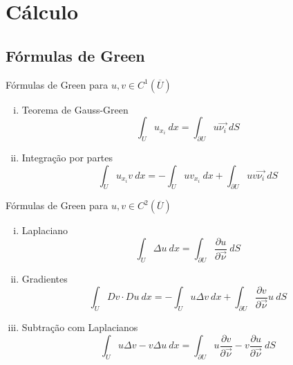 \documentclass[11pt]{article}
\newcommand{\qed}{$\hfill\square$}
\begin{document}
%


\section{Cálculo}

\subsection{Fórmulas de Green}

Fórmulas de Green para \( u,v \in C^1(\overline{U}) \)

\begin{enumerate}[(i)]
	\item Teorema de Gauss-Green \[ \int_U u_{x_i}\ dx = \int_{\partial U} u \vec{\nu_i}\ dS \]
	\item Integração por partes \[ \int_U u_{x_i} v\ dx = - \int_U u v_{x_i}\ dx + \int_{\partial U} u v \vec{\nu_i}\ dS \]
\end{enumerate}

Fórmulas de Green para \( u,v \in C^2 (\overline{U}) \)
\begin{enumerate}[(i)]
	\item Laplaciano \[ \int_U \Delta u\ dx = \int_{\partial U} \frac{\partial u}{\partial \vec{\nu}} \ dS \]
	
	\item Gradientes \[ \int_U Dv \cdot Du \ dx = -\int_U u \Delta v\ dx + \int_{\partial U} \frac{\partial v}{\partial \vec{\nu}} u \ dS \]
	
	\item Subtração com Laplacianos \[\int_U u \Delta v - v \Delta u\ dx = \int_{\partial U} u \frac{\partial v}{\partial \vec{\nu}} - v \frac{\partial u}{\partial \vec{\nu}}\ dS \]
\end{enumerate}
\end{document}
